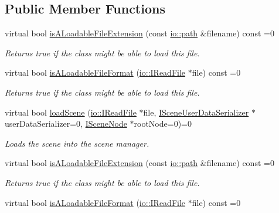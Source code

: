 \subsection*{Public Member Functions}
\begin{DoxyCompactItemize}
\item 
virtual bool \hyperlink{classirr_1_1scene_1_1ISceneLoader_a55b0367762135b84a077ef75ca942594}{is\+A\+Loadable\+File\+Extension} (const \hyperlink{namespaceirr_1_1io_a6468281622ce3a1c46b72e19f32dded5}{io\+::path} \&filename) const =0
\begin{DoxyCompactList}\small\item\em Returns true if the class might be able to load this file. \end{DoxyCompactList}\item 
virtual bool \hyperlink{classirr_1_1scene_1_1ISceneLoader_a5f1b2f44fcac12acdc2f1948d8f3b258}{is\+A\+Loadable\+File\+Format} (\hyperlink{classirr_1_1io_1_1IReadFile}{io\+::\+I\+Read\+File} $\ast$file) const =0
\begin{DoxyCompactList}\small\item\em Returns true if the class might be able to load this file. \end{DoxyCompactList}\item 
virtual bool \hyperlink{classirr_1_1scene_1_1ISceneLoader_a55282c77040a78c2b172d77bbcff8ae8}{load\+Scene} (\hyperlink{classirr_1_1io_1_1IReadFile}{io\+::\+I\+Read\+File} $\ast$file, \hyperlink{classirr_1_1scene_1_1ISceneUserDataSerializer}{I\+Scene\+User\+Data\+Serializer} $\ast$user\+Data\+Serializer=0, \hyperlink{classirr_1_1scene_1_1ISceneNode}{I\+Scene\+Node} $\ast$root\+Node=0)=0
\begin{DoxyCompactList}\small\item\em Loads the scene into the scene manager. \end{DoxyCompactList}\item 
virtual bool \hyperlink{classirr_1_1scene_1_1ISceneLoader_a55b0367762135b84a077ef75ca942594}{is\+A\+Loadable\+File\+Extension} (const \hyperlink{namespaceirr_1_1io_a6468281622ce3a1c46b72e19f32dded5}{io\+::path} \&filename) const =0
\begin{DoxyCompactList}\small\item\em Returns true if the class might be able to load this file. \end{DoxyCompactList}\item 
virtual bool \hyperlink{classirr_1_1scene_1_1ISceneLoader_a5f1b2f44fcac12acdc2f1948d8f3b258}{is\+A\+Loadable\+File\+Format} (\hyperlink{classirr_1_1io_1_1IReadFile}{io\+::\+I\+Read\+File} $\ast$file) const =0

\end{DoxyCompactItemize}

